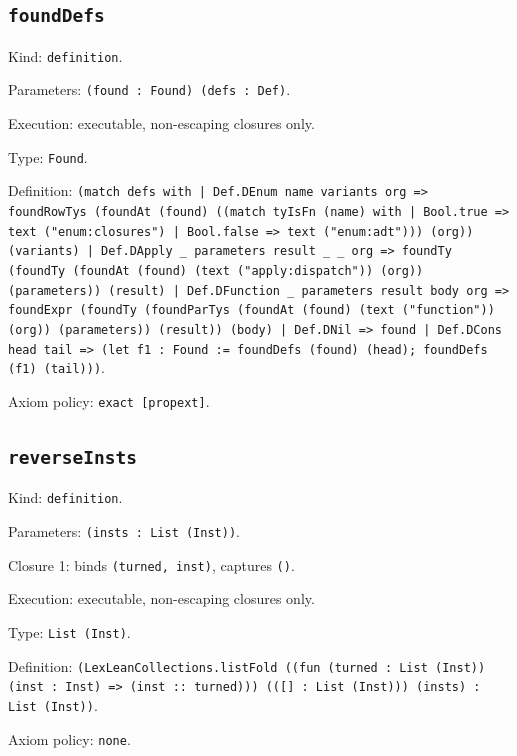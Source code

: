 \documentclass[11pt]{article}
\begin{document}
\subsection*{\texttt{foundDefs}}
\noindent Kind: \texttt{definition}.\par
\noindent Parameters: \texttt{(found : Found) (defs : Def)}.\par
\noindent Execution: executable, non-escaping closures only.\par
\noindent Type: \texttt{Found}.\par
\noindent Definition: \texttt{(match defs with | Def.DEnum name variants org => foundRowTys (foundAt (found) ((match tyIsFn (name) with | Bool.true => text ("enum:closures") | Bool.false => text ("enum:adt"))) (org)) (variants) | Def.DApply \_ parameters result \_ \_ org => foundTy (foundTy (foundAt (found) (text ("apply:dispatch")) (org)) (parameters)) (result) | Def.DFunction \_ parameters result body org => foundExpr (foundTy (foundParTys (foundAt (found) (text ("function")) (org)) (parameters)) (result)) (body) | Def.DNil => found | Def.DCons head tail => (let f1 : Found := foundDefs (found) (head); foundDefs (f1) (tail)))}.\par
\noindent Axiom policy: \texttt{exact [propext]}.\par
\subsection*{\texttt{reverseInsts}}
\noindent Kind: \texttt{definition}.\par
\noindent Parameters: \texttt{(insts : List (Inst))}.\par
\noindent Closure 1: binds \texttt{(turned, inst)}, captures \texttt{()}.\par
\noindent Execution: executable, non-escaping closures only.\par
\noindent Type: \texttt{List (Inst)}.\par
\noindent Definition: \texttt{(LexLeanCollections.listFold ((fun (turned : List (Inst)) (inst : Inst) => (inst :: turned))) (([] : List (Inst))) (insts) : List (Inst))}.\par
\noindent Axiom policy: \texttt{none}.\par
\end{document}
